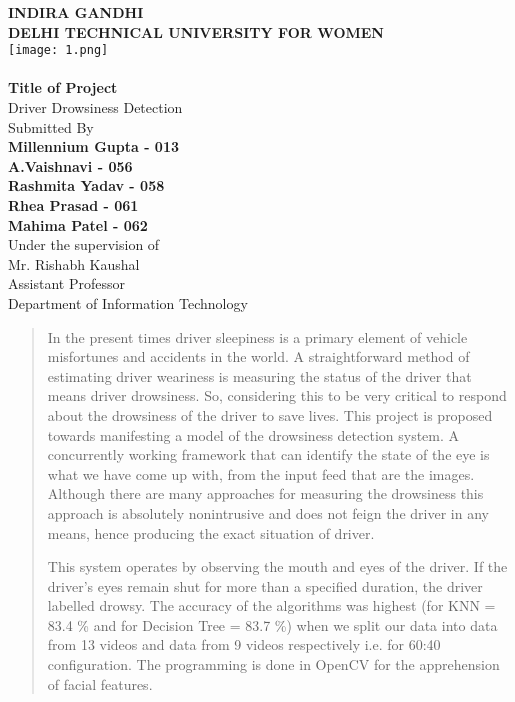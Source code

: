 \documentclass{article}
\begin{document}
\begin{center}
    
\LARGE \textbf{
INDIRA GANDHI \\DELHI TECHNICAL UNIVERSITY FOR WOMEN\\}
\vspace{5mm}
\texttt{[image: 1.png]}\\
\LARGE \textbf{\\Title of Project}\\
Driver Drowsiness Detection\\
Submitted By\\
\textbf{Millennium Gupta - 013}\\
\textbf{A.Vaishnavi - 056}\\
\textbf{Rashmita Yadav - 058}\\
\textbf{Rhea Prasad - 061}\\
\textbf{Mahima Patel - 062}\\
\vspace{2cm}
Under the supervision of \\
Mr. Rishabh Kaushal\\
Assistant Professor\\
Department of Information Technology

\end{center}   

\newpage


\begin{abstract}
In the present times driver sleepiness is a primary element of vehicle misfortunes and accidents in the world. A straightforward method of estimating driver weariness is measuring the status of the driver that means driver drowsiness. So, considering this to be very critical to respond about the drowsiness of the driver to save lives. This project is proposed towards manifesting a model of the drowsiness detection system. A concurrently working framework that can identify the state of the eye is what we have come up with, from the input feed that are the images. Although there are many approaches for measuring the drowsiness this approach is absolutely nonintrusive and does not feign the driver in any means, hence producing the exact situation of driver.

This system operates by observing the mouth and eyes of the driver. If the driver’s eyes remain shut for more than a speciﬁed duration, the driver labelled drowsy. The accuracy of the algorithms was highest (for KNN = 83.4 \% and for Decision Tree = 83.7 \%) when we split our data into data from 13 videos and data from 9 videos respectively i.e. for 60:40 conﬁguration. The programming is done in OpenCV for the apprehension of facial features.
    


\end{abstract}
\newpage
\end{document}
